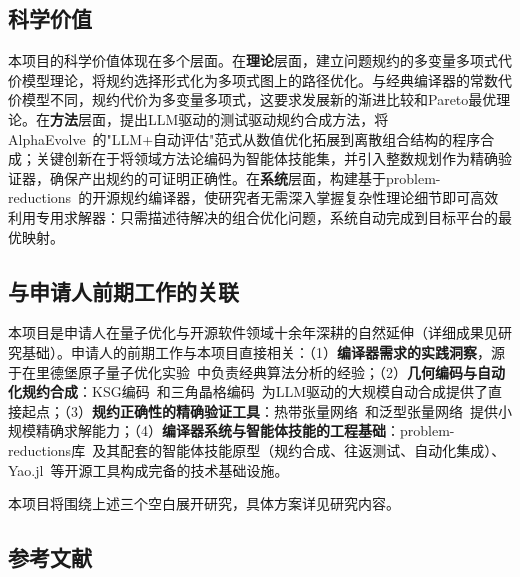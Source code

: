 \subsection{科学价值}

本项目的科学价值体现在多个层面。在\textbf{理论}层面，建立问题规约的多变量多项式代价模型理论，将规约选择形式化为多项式图上的路径优化。与经典编译器的常数代价模型不同，规约代价为多变量多项式，这要求发展新的渐进比较和Pareto最优理论。在\textbf{方法}层面，提出LLM驱动的测试驱动规约合成方法，将AlphaEvolve~\cite{AlphaEvolve2025}的"LLM+自动评估"范式从数值优化拓展到离散组合结构的程序合成；关键创新在于将领域方法论编码为智能体技能集，并引入整数规划作为精确验证器，确保产出规约的可证明正确性。在\textbf{系统}层面，构建基于problem-reductions~\cite{ProblemReductions2025}的开源规约编译器，使研究者无需深入掌握复杂性理论细节即可高效利用专用求解器：只需描述待解决的组合优化问题，系统自动完成到目标平台的最优映射。
\subsection{与申请人前期工作的关联}

本项目是申请人在量子优化与开源软件领域十余年深耕的自然延伸（详细成果见研究基础）。申请人的前期工作与本项目直接相关：（1）\textbf{编译器需求的实践洞察}，源于在里德堡原子量子优化实验~\cite{Ebadi2022Science}中负责经典算法分析的经验；（2）\textbf{几何编码与自动化规约合成}：KSG编码~\cite{Nguyen2023PRXQuantum}和三角晶格编码~\cite{Pan2025Triangular}为LLM驱动的大规模自动合成提供了直接起点；（3）\textbf{规约正确性的精确验证工具}：热带张量网络~\cite{Liu2021PRL}和泛型张量网络~\cite{Liu2023SIAM}提供小规模精确求解能力；（4）\textbf{编译器系统与智能体技能的工程基础}：problem-reductions库~\cite{ProblemReductions2025}及其配套的智能体技能原型（规约合成、往返测试、自动化集成）、Yao.jl~\cite{Luo2020Quantum}等开源工具构成完备的技术基础设施。

本项目将围绕上述三个空白展开研究，具体方案详见研究内容。

\begin{REF}
\subsection*{参考文献}
\vspace{-50pt}

\end{REF}

\newpage
